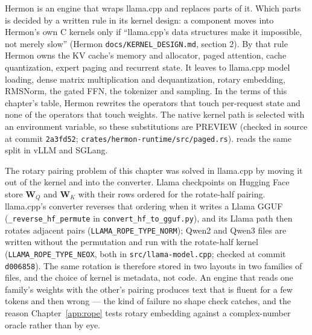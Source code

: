 
Hermon is an engine that wraps llama.cpp and replaces parts of it. Which parts
is decided by a written rule in its kernel design: a component moves into
Hermon's own C kernels only if ``llama.cpp's data structures make it
impossible, not merely slow'' (Hermon \texttt{docs/KERNEL\_DESIGN.md}, section 2).
By that rule Hermon owns the KV cache's memory and allocator, paged attention,
cache quantization, expert paging and recurrent state. It leaves to llama.cpp
model loading, dense matrix multiplication and dequantization, rotary
embedding, RMSNorm, the gated FFN, the tokenizer and sampling. In the terms of
this chapter's table, Hermon rewrites the operators that touch per-request
state and none of the operators that touch weights. The native kernel path is
selected with an environment variable, so these substitutions are PREVIEW
(checked in source at commit \texttt{2a3fd52}; \texttt{crates/hermon-runtime/src/paged.rs}).
 reads the same split in vLLM and SGLang.

The rotary pairing problem of this chapter was solved in llama.cpp by moving it
out of the kernel and into the converter. Llama checkpoints on Hugging Face
store $\mathbf{W}_Q$ and $\mathbf{W}_K$ with their rows ordered for the
rotate-half pairing. llama.cpp's converter reverses that ordering when it
writes a Llama GGUF (\texttt{\_reverse\_hf\_permute} in
\texttt{convert\_hf\_to\_gguf.py}), and its Llama path then rotates adjacent
pairs (\texttt{LLAMA\_ROPE\_TYPE\_NORM}); Qwen2 and Qwen3 files are written
without the permutation and run with the rotate-half kernel
(\texttt{LLAMA\_ROPE\_TYPE\_NEOX}, both in \texttt{src/llama-model.cpp}; checked
at commit \texttt{d006858}). The same rotation is therefore stored in two
layouts in two families of files, and the choice of kernel is metadata, not
code. An engine that reads one family's weights with the other's pairing
produces text that is fluent for a few tokens and then wrong --- the kind of
failure no shape check catches, and the reason
Chapter~\ref{app:rope} tests rotary embedding against a complex-number oracle
rather than by eye.



